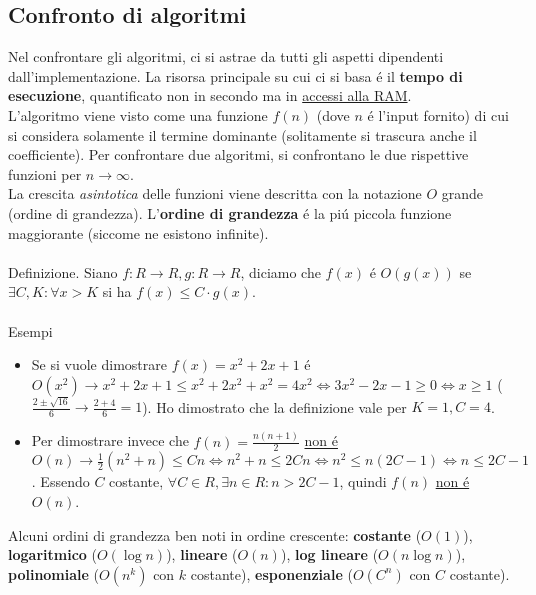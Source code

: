 \documentclass{article}
\begin{document}
\subsection{Confronto di algoritmi}
Nel confrontare gli algoritmi, ci si astrae da tutti gli aspetti dipendenti dall'implementazione. La risorsa principale su cui ci si basa é il \textbf{tempo di esecuzione}, quantificato non in secondo ma in \underline{accessi alla RAM}.\\
L'algoritmo viene visto come una funzione $f(n)$ (dove $n$ é l'input fornito) di cui si considera solamente il termine dominante (solitamente si trascura anche il coefficiente). Per confrontare due algoritmi, si confrontano le due rispettive funzioni per $n \to \infty$.\\
La crescita \textit{asintotica} delle funzioni viene descritta con la notazione $O$ grande (ordine di grandezza). L'\textbf{ordine di grandezza} é la piú piccola funzione maggiorante (siccome ne esistono infinite).\\\\
Definizione. Siano $f : R \to R, g : R \to R$, diciamo che $f(x)$ é $O(g(x))$ se $\exists C, K : \forall x > K$ si ha $f(x) \le C \cdot g(x)$.\\\\
Esempi
\begin{itemize}
	\item Se si vuole dimostrare $f(x) = x^2+2x+1$ é $O(x^2) \rightarrow x^2+2x+1 \le x^2+2x^2+x^2 = 4x^2 \iff 3x^2-2x-1 \ge 0 \iff x \ge 1$ ($\frac{2 \pm \sqrt{16}}{6} \rightarrow \frac{2 + 4}{6} = 1$). Ho dimostrato che la definizione vale per $K=1, C=4$.
	\item Per dimostrare invece che $f(n)=\frac{n(n+1)}{2}$ \underline{non é} $O(n) \rightarrow \frac{1}{2}(n^2+n) \le Cn \iff n^2+n \le 2Cn \iff n^2 \le n(2C-1) \iff n \le 2C-1$. Essendo $C$ costante, $\forall C \in R, \exists n \in R : n > 2C-1$, quindi $f(n)$ \underline{non é} $O(n)$.
\end{itemize}
Alcuni ordini di grandezza ben noti in ordine crescente: \textbf{costante} ($O(1)$), \textbf{logaritmico} ($O(\log{n})$), \textbf{lineare} ($O(n)$), \textbf{log lineare} ($O(n \log{n})$), \textbf{polinomiale} ($O(n^k)$ con $k$ costante), \textbf{esponenziale} ($O(C^n)$ con $C$ costante).
\end{document}
